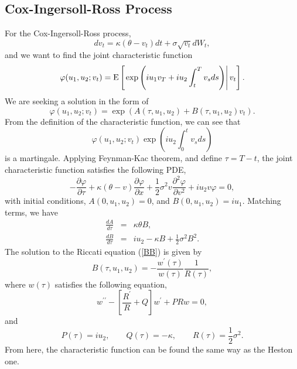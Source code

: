 \documentclass[12pt]{article}
\begin{document}
  \subsection{Cox-Ingersoll-Ross Process}

    For the Cox-Ingersoll-Ross process,
    \begin{equation}
      dv_t = \kappa(\theta - v_t)dt + \sigma\sqrt{v_t}dW_t,
    \end{equation}
    and we want to find the joint characteristic function
    \begin{equation}
      \varphi(u_1,u_2;v_t)={\rm E}\left[\left. \exp\left(iu_1v_T+iu_2\int_t^Tv_sds\right)\right| v_t\right].
    \end{equation}
    We are seeking a solution in the form of
    \begin{equation}
      \varphi(u_1,u_2;v_t)=\exp\left(A(\tau,u_1,u_2)+B(\tau,u_1,u_2)v_t\right).
    \end{equation}
    From the definition of the characteristic function, we can see that
    \begin{equation}
      \varphi(u_1,u_2;v_t)\exp\left(iu_2\int_0^tv_sds\right)
    \end{equation}
    is a martingale. Applying Feynman-Kac theorem, and define $\tau=T-t$, the joint characteristic function satisfies the following PDE,
    \begin{equation}
      -\frac{\partial \varphi}{\partial \tau}
      + \kappa(\theta - v)\frac{\partial \varphi}{\partial x}
      +\frac{1}{2}\sigma^2v\frac{\partial^2 \varphi}{\partial v^2}
      +iu_2v\varphi = 0,
    \end{equation}
    with initial conditions, $A(0,u_1,u_2)=0$, and $B(0,u_1,u_2)=iu_1$. Matching terms, we have
    \begin{eqnarray}
      \frac{dA}{d\tau} &=& \kappa\theta B, \label{AA} \\
      \frac{dB}{d\tau} &=& iu_2 - \kappa B + \frac{1}{2}\sigma^2B^2. \label{BB}
    \end{eqnarray}
    The solution to the Riccati equation (\ref{BB}) is given by
    \begin{equation}
      B(\tau,u_1,u_2)=-\frac{w^{\prime}(\tau)}{w(\tau)}\frac{1}{R(\tau)},
    \end{equation}
    where $w(\tau)$ satisfies the following equation,
    \begin{equation}
      w^{\prime\prime}-\left[\frac{R^{\prime}}{R}+Q\right]w^{\prime}+PRw=0,
    \end{equation}
    and
    \begin{equation}
      P(\tau) = iu_2, \quad\quad Q(\tau)=-\kappa, \quad\quad R(\tau)=\frac{1}{2}\sigma^2.
    \end{equation}
    From here, the characteristic function can be found the same way as the Heston one.
\end{document}

